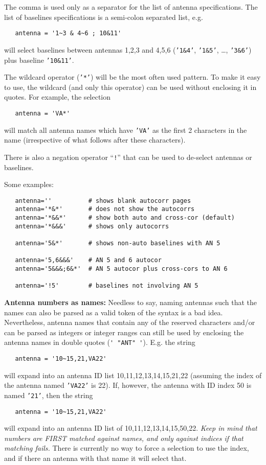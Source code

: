 The comma is used only as a separator for the list of antenna
specifications.  The list of baselines specifications is a
semi-colon separated list, e.g.
\small
\begin{verbatim}
   antenna = '1~3 & 4~6 ; 10&11'
\end{verbatim}
\normalsize
will select baselines between antennas 1,2,3 and 4,5,6
({\tt '1\&4'}, {\tt '1\&5'}, \ldots, {\tt '3\&6'}) plus
baseline {\tt '10\&11'}.

The wildcard operator ({\tt '*'}) will be the most often used
pattern. To make it easy to use, the wildcard (and only this
operator) can be used without enclosing it in quotes.  
For example, the selection
\small
\begin{verbatim}
   antenna = 'VA*'
\end{verbatim}
\normalsize
will match all antenna names which have {\tt 'VA'} as the first 2
characters in the name (irrespective of what follows after these
characters).

There is also a negation operator ``{\tt !}'' that can be used to
de-select antennas or baselines.

Some examples:
\small
\begin{verbatim}
   antenna=''          # shows blank autocorr pages
   antenna='*&*'       # does not show the autocorrs
   antenna='*&&*'      # show both auto and cross-cor (default)
   antenna='*&&&'      # shows only autocorrs

   antenna='5&*'       # shows non-auto baselines with AN 5

   antenna='5,6&&&'    # AN 5 and 6 autocor
   antenna='5&&&;6&*'  # AN 5 autocor plus cross-cors to AN 6

   antenna='!5'        # baselines not involving AN 5
\end{verbatim}
\normalsize

{\bf Antenna numbers as names:}
Needless to say, naming antennas such that the names can also be
parsed as a valid token of the syntax is a bad idea.  Nevertheless,
antenna names that contain any of the reserved characters and/or can be
parsed as integers or integer ranges can still be used by enclosing
the antenna names in double quotes ({\verb!' "ANT" '!}).  E.g. the string
\small
\begin{verbatim}
   antenna = '10~15,21,VA22'
\end{verbatim}
\normalsize
will expand into an antenna ID list 10,11,12,13,14,15,21,22 (assuming
the index of the antenna named {\tt 'VA22'} is 22).  
If, however, the antenna with ID index 50 is named {\tt '21'}, then
the string 
\small
\begin{verbatim}
   antenna = '10~15,21,VA22'
\end{verbatim}
\normalsize
will expand into an antenna ID list of 10,11,12,13,14,15,50,22.
{\em Keep in mind that numbers are FIRST matched against
names, and only against indices if that matching fails.}
There is currently no way to force a selection to use the index, and
if there an antenna with that name it will select that.


